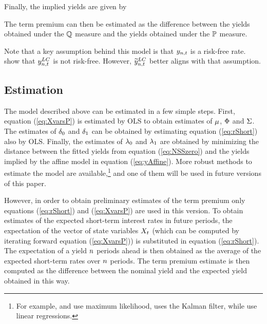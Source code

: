 Finally, the implied yields are given by
	
 
The term premium can then be estimated as the difference between the yields obtained under the $\mathbb{Q}$ measure and the yields obtained under the $\mathbb{P}$ measure.

Note that a key assumption behind this model is that $y_{n,t}$ is a risk-free rate. \cite{DuSchreger:2016a} show that $y_{n,t} ^{LC}$ is not risk-free. However, $\widetilde{y}_{n,t} ^{LC}$ better aligns with that assumption.

\subsection{Estimation} \label{sec:ATSM_est}
The model described above can be estimated in a few simple steps. First, equation (\ref{eq:XvarsP}) is estimated by OLS to obtain estimates of $\mu$, $\Phi$ and $\Sigma$. The estimates of $\delta_{0}$ and $\delta_{1}$ can be obtained by estimating equation (\ref{eq:rShort}) also by OLS. Finally, the estimates of $\lambda_{0}$ and $\lambda_{1}$ are obtained by minimizing the distance between the fitted yields from equation (\ref{eq:NSSzero}) and the yields implied by the affine model in equation (\ref{eq:yAffine}). More robust methods to estimate the model are available,\footnote{For example, \citet*{JSZ:2011} and \cite{HamiltonWu:2012} use maximum likelihood, \cite{Duffee:2011b} uses the Kalman filter, while \citet*{ACM:2013} use linear regressions.\label{fn:est_methods}} and one of them will be used in future versions of this paper.

However, in order to obtain preliminary estimates of the term premium only equations (\ref{eq:rShort}) and (\ref{eq:XvarsP}) are used in this version. To obtain estimates of the expected short-term interest rates in future periods, the expectation of the vector of state variables $X_{t}$ (which can be computed by iterating forward equation (\ref{eq:XvarsP})) is substituted in equation (\ref{eq:rShort}). The expectation of a yield $n$ periods ahead is then obtained as the average of the expected short-term rates over $n$ periods. The term premium estimate is then computed as the difference between the nominal yield and the expected yield obtained in this way.

